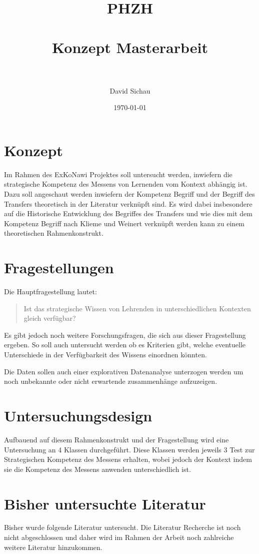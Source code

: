 \documentclass[paper=a4, fontsize=12pt, parskip=half]{scrartcl} %
\title{	
\normalfont \normalsize 
\textsc{PHZH} \\ [0.4cm] %
\horrule{0.5pt} \\[0.3cm] %
\huge Konzept Masterarbeit \\ %
\horrule{2pt} \\[0.4cm] %
}
\author{David Sichau} %
\date{\normalsize\today} %
\begin{document}
\maketitle %

\tableofcontents


\section{Konzept}

Im Rahmen des ExKoNawi Projektes soll untersucht werden, inwiefern die strategische Kompetenz des Messens von Lernenden vom Kontext abhängig ist. 
Dazu soll angeschaut werden inwiefern der Kompetenz Begriff und der Begriff des Transfers theoretisch in der Literatur verknüpft sind. Es wird dabei insbesondere auf die Historische Entwicklung des Begriffes des Transfers und wie dies mit dem Kompetenz Begriff nach Klieme und Weinert verknüpft werden kann zu einem theoretischen Rahmenkonstrukt.

\section{Fragestellungen}

Die Hauptfragestellung lautet:
\begin{quote}
Ist das strategische Wissen von Lehrenden in unterschiedlichen Kontexten gleich verfügbar?
\end{quote}
Es gibt jedoch noch weitere Forschungsfragen, die sich aus dieser Fragestellung ergeben. So soll auch untersucht werden ob es Kriterien gibt, welche eventuelle Unterschiede in der Verfügbarkeit des Wissens einordnen könnten.

Die Daten sollen auch einer explorativen Datenanalyse unterzogen werden um noch unbekannte oder nicht erwartende zusammenhänge aufzuzeigen.

\section{Untersuchungsdesign}

Aufbauend auf diesem Rahmenkonstrukt und der Fragestellung wird eine Untersuchung an 4 Klassen durchgeführt. Diese Klassen werden jeweils 3 Test zur Strategischen Kompetenz des Messens erhalten, wobei jedoch der Kontext indem sie die Kompetenz des Messens anwenden unterschiedlich ist. 

\section{Bisher untersuchte Literatur}

Bisher wurde folgende Literatur untersucht. Die Literatur Recherche ist noch nicht abgeschlossen und daher wird im Rahmen der Arbeit noch zahlreiche weitere Literatur hinzukommen.



\printbibliography[heading=none]
\end{document}
